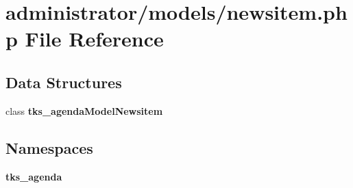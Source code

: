 \section{administrator/models/newsitem.php File Reference}
\label{administrator_2models_2newsitem_8php}
\subsection*{Data Structures}
\begin{DoxyCompactItemize}
\item 
class \textbf{ tks\+\_\+agenda\+Model\+Newsitem}
\end{DoxyCompactItemize}
\subsection*{Namespaces}
\begin{DoxyCompactItemize}
\item 
 \textbf{ tks\+\_\+agenda}
\end{DoxyCompactItemize}
